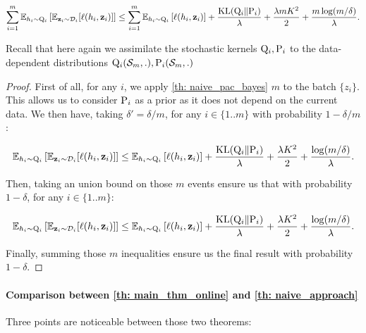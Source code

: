 \begin{noaddcontents}
\begin{theorem}
  \begin{align*}
    \sum_{i=1}^m \mathbb{E}_{h_i\sim \Q_{i}}\left[ \mathbb{E}_{\z_i\sim \D_i}[\ell(h_i,\z_i)]    \right] \leq \sum_{i=1}^m \mathbb{E}_{h_i\sim \Q_{i}}\left[ \ell(h_i,\z_i) \right] +
    \frac{\operatorname{KL}(\Q_{i}\| \P_{i})}{\lambda} + \frac{\lambda m K^2}{2} + \frac{m\log(m/\delta)}{\lambda}.
  \end{align*}
\end{theorem}

Recall that here again we assimilate the stochastic kernels $\Q_{i}, \P_{i}$ to the data-dependent distributions $\Q_{i}(\Sm,.), \P_{i}(\Sm,.)$

\begin{proof}
  First of all, for any $i$, we apply \cref{th: naive_pac_bayes} $m$ to the batch $\{ z_i\}$. This allows us to consider $\P_{i}$ as a prior as it does not depend on the current data. We then have, taking $\delta'=\delta/m$, for any $i\in\{1..m\}$ with probability $ 1- \delta/m$:

  \[ \mathbb{E}_{h_i\sim \Q_{i}}\left[ \mathbb{E}_{\z_i\sim \D_i}[\ell(h_i,\z_i)]    \right] \leq  \mathbb{E}_{h_i\sim \Q_{i}}\left[ \ell(h_i,\z_i) \right] +
  \frac{\operatorname{KL}(\Q_{i}\| \P_{i})}{\lambda} + \frac{\lambda K^2}{2} + \frac{\log(m/\delta)}{\lambda}. \]

  Then, taking an union bound on those $m$ events ensure us that with probability $1-\delta$, for any $i\in\{1..m\}$:

  \[ \mathbb{E}_{h_i\sim \Q_{i}}\left[ \mathbb{E}_{\z_i\sim \D_i}[\ell(h_i,\z_i)]    \right] \leq  \mathbb{E}_{h_i\sim \Q_{i}}\left[ \ell(h_i,\z_i) \right] +
  \frac{\operatorname{KL}(\Q_{i}\| \P_{i})}{\lambda} + \frac{\lambda  K^2}{2} + \frac{\log(m/\delta)}{\lambda}. \]


  Finally, summing those $m$ inequalities ensure us the final result with probability $1-\delta$.

\end{proof}

\paragraph{Comparison between \cref{th: main_thm_online} and \cref{th: naive_approach}}   Three points are noticeable between those two theorems:


\end{noaddcontents}
